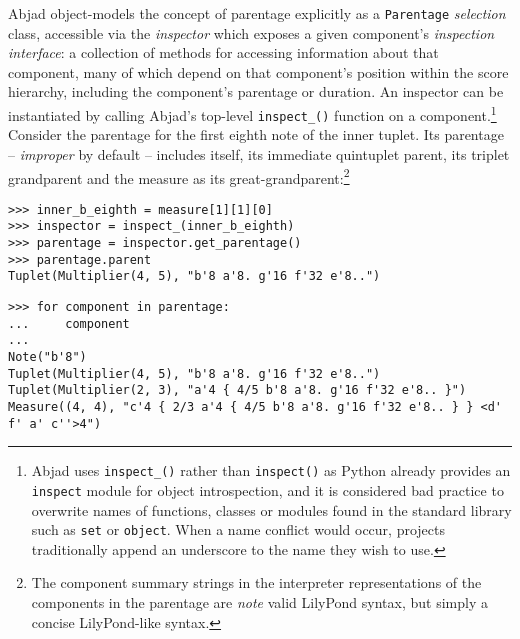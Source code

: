 Abjad object-models the concept of parentage explicitly as a \texttt{Parentage}
\emph{selection} class, accessible via the \emph{inspector} which exposes a
given component's \emph{inspection interface}: a collection of methods for
accessing information about that component, many of which depend on that
component's position within the score hierarchy, including the component's
parentage or duration. An inspector can be instantiated by calling Abjad's
top-level \texttt{inspect\_()} function on a component.\footnote{Abjad uses
\texttt{inspect\_()} rather than \texttt{inspect()} as Python already provides
an \texttt{inspect} module for object introspection, and it is considered bad
practice to overwrite names of functions, classes or modules found in the
standard library such as \texttt{set} or \texttt{object}. When a name conflict
would occur, projects traditionally append an underscore to the name they wish
to use.} Consider the parentage for the first eighth note of the inner tuplet.
Its parentage -- \emph{improper} by default -- includes itself, its immediate
quintuplet parent, its triplet grandparent and the  measure as its
great-grandparent:\footnote{The component summary strings in the interpreter
representations of the components in the parentage are \emph{note} valid
LilyPond syntax, but simply a concise LilyPond-like syntax.}

\begin{comment}
<abjad>
inner_b_eighth = measure[1][1][0]
inspector = inspect_(inner_b_eighth)
parentage = inspector.get_parentage()
parentage.parent
for component in parentage:
    component

</abjad>
\end{comment}

\begin{abjadbookoutput}
\begin{singlespacing}
\vspace{-0.5\baselineskip}
\begin{verbatim}
>>> inner_b_eighth = measure[1][1][0]
>>> inspector = inspect_(inner_b_eighth)
>>> parentage = inspector.get_parentage()
>>> parentage.parent
Tuplet(Multiplier(4, 5), "b'8 a'8. g'16 f'32 e'8..")
\end{verbatim}
\begin{verbatim}
>>> for component in parentage:
...     component
...
Note("b'8")
Tuplet(Multiplier(4, 5), "b'8 a'8. g'16 f'32 e'8..")
Tuplet(Multiplier(2, 3), "a'4 { 4/5 b'8 a'8. g'16 f'32 e'8.. }")
Measure((4, 4), "c'4 { 2/3 a'4 { 4/5 b'8 a'8. g'16 f'32 e'8.. } } <d' f' a' c''>4")
\end{verbatim}
\end{singlespacing}
\end{abjadbookoutput}

